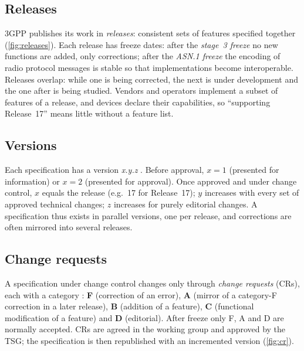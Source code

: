 \documentclass[11pt,a4paper]{article}
\begin{document}
\subsection{Releases}
3GPP publishes its work in \emph{releases}: consistent sets of features specified together (\cref{fig:releases}).
Each release has freeze dates: after the \emph{stage~3 freeze} no new functions are added, only corrections; after the
\emph{ASN.1 freeze} the encoding of radio protocol messages is stable so that implementations become
interoperable. Releases overlap: while one is being corrected, the next is under development and the one after
is being studied. Vendors and operators implement a subset of features of a release, and devices declare their
capabilities, so ``supporting Release~17'' means little without a feature list.

\begin{acnfigure}
  \caption{Selected 3GPP releases with headline features. Years indicate approximate completion; teal marks 5G releases.}
  \label{fig:releases}
\end{acnfigure}

\subsection{Versions}
Each specification has a version \emph{x.y.z} \cite{tr21900}. Before approval, $x = 1$ (presented for information)
or $x = 2$ (presented for approval). Once approved and under change control, $x$ equals the release (e.g.\ 17 for
Release~17); $y$ increases with every set of approved technical changes; $z$ increases for purely editorial
changes. A specification thus exists in parallel versions, one per release, and corrections are often mirrored
into several releases.

\subsection{Change requests}
A specification under change control changes only through \emph{change requests} (CRs), each with a category
\cite{tr21900}: \textbf{F} (correction of an error), \textbf{A} (mirror of a category-F correction in a later
release), \textbf{B} (addition of a feature), \textbf{C} (functional modification of a feature) and \textbf{D}
(editorial). After freeze only F, A and D are normally accepted. CRs are agreed in the working group and approved by
the TSG; the specification is then republished with an incremented version (\cref{fig:cr}).
\end{document}
